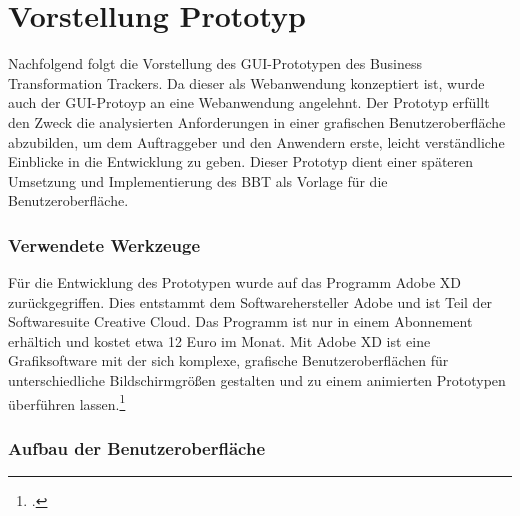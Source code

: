 \section{Vorstellung Prototyp}
Nachfolgend folgt die Vorstellung des GUI-Prototypen des Business Transformation Trackers. Da dieser als Webanwendung konzeptiert ist, wurde auch der GUI-Protoyp an eine Webanwendung angelehnt. Der Prototyp erfüllt den Zweck die analysierten Anforderungen in einer grafischen Benutzeroberfläche abzubilden, um dem Auftraggeber und den Anwendern erste, leicht verständliche Einblicke in die Entwicklung zu geben. Dieser Prototyp dient einer späteren Umsetzung und Implementierung des BBT als Vorlage für die Benutzeroberfläche.

\subsubsection{Verwendete Werkzeuge}
Für die Entwicklung des Prototypen wurde auf das Programm Adobe XD zurückgegriffen. Dies entstammt dem Softwarehersteller Adobe und ist Teil der Softwaresuite \glqq{}Creative Cloud\grqq{}. Das Programm ist nur in einem Abonnement erhältich und kostet etwa 12 Euro im Monat. Mit Adobe XD ist eine Grafiksoftware mit der sich komplexe, grafische Benutzeroberflächen für unterschiedliche Bildschirmgrößen gestalten und zu einem animierten Prototypen überführen lassen.\footcite[Vgl.][]{adobe}


\subsubsection{Aufbau der Benutzeroberfläche}